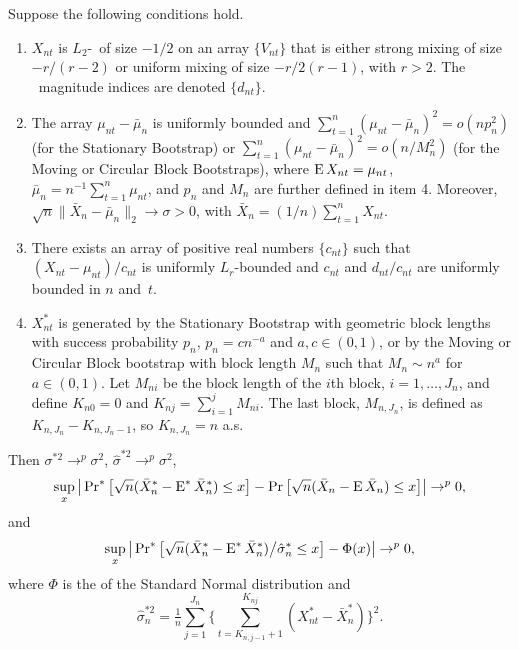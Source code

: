 \documentclass[11pt]{article}
\begin{document}
\begin{thm}\label{T1}
  Suppose the following conditions hold.
  \begin{enumerate}
  \item $X_{nt}$ is $L_2$-\ned\ of size $-1/2$ on an array
    $\{V_{nt}\}$ that is either strong mixing of size $-r/(r-2)$ or
    uniform mixing of size $-r/2(r-1)$, with $r > 2$.  The
    \ned\ magnitude indices are denoted $\{d_{nt}\}$.
  \item The array $\mu_{nt} - \bar \mu_n$ is uniformly bounded
    and $\sum_{t=1}^n (\mu_{nt} - \bar \mu_n)^2 = o(n p_n^2)$ (for
    the Stationary Bootstrap) or
    $\sum_{t=1}^n (\mu_{nt} - \bar \mu_n)^2 = o(n/M_n^2)$ (for
    the Moving or Circular Block Bootstraps),
    where $\operatorname{E} X_{nt} = \mu_{nt}$, $\bar{\mu}_n = n^{-1} \sum_{t=1}^n
    \mu_{nt}$, and $p_n$ and $M_n$ are further defined in item 4.
    Moreover, $\sqrt{n} \| \bar{X}_{n} - \bar\mu_n \|_2
    \to \sigma > 0$, with $\bar X_n = (1/n) \sum_{t=1}^n X_{nt}$.
  \item There exists an array of positive real numbers $\{c_{nt}\}$
    such that $(X_{nt} - \mu_{nt})/c_{nt}$ is uniformly $L_r$-bounded
    and $c_{nt}$ and $d_{nt}/c_{nt}$ are uniformly bounded in $n$
    and~$t$.
  \item $X_{nt}^{*}$ is generated by the Stationary Bootstrap with
    geometric block lengths with success probability $p_n$, $p_n = c
    n^{-a}$ and $a,c \in (0,1)$, or by the Moving or Circular Block
    bootstrap with block length $M_n$ such that $M_n \sim n^a$ for
    $a \in (0,1)$.  Let $M_{ni}$ be the block length of the $i$th
    block, $i=1,\dots,J_n$, and define $K_{n0} = 0$ and $K_{nj} =
    \sum_{i=1}^j M_{ni}$. The last block, $M_{n,J_n}$, is defined as
    $K_{n,J_n} - K_{n,J_n-1}$, so $K_{n,J_n} = n$ a.s.
  \end{enumerate}
  Then $\sigma^{*2} \to^p \sigma^2$, $\hat\sigma^{*2} \to^p \sigma^2$,
  \begin{equation}\label{eq:36}
    \sup_x \big\lvert \operatorname{Pr}^{*}\big[\sqrt{n}(\bar X_{n}^{*} - \operatorname{E}^* \bar X_n^*) \leq x \big]
    - \operatorname{Pr} \big[\sqrt{n}(\bar X_{n} - \operatorname{E} \bar X_n) \leq x \big] \big\rvert \to^p 0,
  \end{equation}
  and
  \begin{equation}
    \label{eq:2}
    \sup_x \big\lvert \operatorname{Pr}^{*}\big[
    \sqrt{n}(\bar X_{n}^{*} -  \operatorname{E}^* \bar X_n^*) \big/ \hat\sigma_n^{*}
    \leq x \big] - \Phi(x) \big\rvert \to^p 0,
  \end{equation}
  where $\Phi$ is the  of the Standard Normal
  distribution and
    \begin{equation}
      \label{eq:3}
      \hat{\sigma}_n^{*2} = \tfrac{1}{n} \sum_{j=1}^{J_n}
      \Big\{\sum_{t=K_{n,j-1}+1}^{K_{nj}} (X_{nt}^{*} - \bar X_{n}^{*})\Big\}^2.
    \end{equation}
\end{thm}
\end{document}
